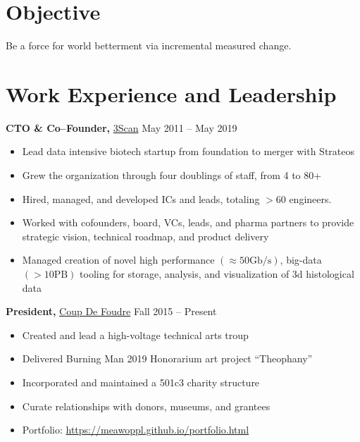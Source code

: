 \documentclass{res}
\begin{document}

\address{{\bf Home Address} \\ 166 Sanchez \#7 \\ San Francisco, CA 94114 \\
        (520) 591-5245 \\ meawoppl@gmail.com }
\address{{\bf Workshop Address} \\ 951 Hudson Ave \\ San Francisco, CA 94124 \\
        (562) 546-3326 \\ \href{https://meawoppl.github.io}{meawoppl.github.io}}

\begin{resume}

\section{Objective}
Be a force for world betterment via incremental measured change.

\section{Work Experience and Leadership}

{\bf CTO \& Co--Founder,} \href{http://www.3scan.com}{3Scan} \hfill
May 2011 -- May 2019
\begin{itemize}  \itemsep -2pt
  \item Lead data intensive biotech startup from foundation to merger with Strateos
  \item Grew the organization through four doublings of staff, from 4 to 80+
  \item Hired, managed, and developed ICs and leads, totaling $> 60$ engineers.
  \item Worked with cofounders, board, VCs, leads, and pharma partners to provide strategic vision,
    technical roadmap, and product delivery
  \item Managed creation of novel high performance $(\approx 50 \mathrm{Gb/s})$, big-data $(> 10\mathrm{PB})$ tooling for
    storage, analysis, and visualization of 3d histological data
\end{itemize}

{\bf President,}  \href{http://coupdefoud.re}{Coup De Foudre} \hfill   Fall 2015 -- Present
\begin{itemize} \itemsep -2pt
  \item Created and lead a high-voltage technical arts troup
  \item Delivered Burning Man 2019 Honorarium art project ``Theophany''
  \item Incorporated and maintained a 501c3 charity structure
  \item Curate relationships with donors, museums, and grantees
  \item Portfolio: \href{https://meawoppl.github.io/portfolio.html}{https://meawoppl.github.io/portfolio.html}
\end{itemize}


\end{resume}
\end{document}
